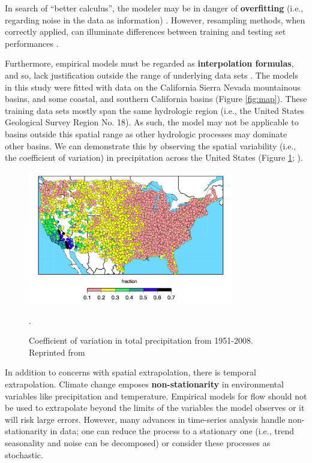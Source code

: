 In search of ``better calculus'', the modeler may be in danger of \textbf{overfitting} (i.e., regarding noise in the data as information) \cite{klemes1982empirical}. However, resampling methods, when correctly applied, can illuminate differences between training and testing set performances \cite{friedman2001elements}.

Furthermore, empirical models must be regarded as \textbf{interpolation formulas}, and so, lack justification outside the range of underlying data sets \cite{klemes1982empirical}. The models in this study were fitted with data on the California Sierra Nevada mountainous basins, and some coastal, and southern California basins (Figure \ref{fig:map}). These training data sets mostly span the same hydrologic region (i.e., the United States Geological Survey Region No. 18). As such, the model may not be applicable to basins outside this spatial range as other hydrologic processes may dominate other basins. We can demonstrate this by observing the spatial variability (i.e., the coefficient of variation) in precipitation across the United States (Figure \ref{fig:coefvar}; ). 

\begin{figure}[ht]
	\centering
	\includegraphics[width=0.8\textwidth,trim={0 0 0 0},clip=true]{Plots/ch1_coefficientofvariation.png}
	\caption{Coefficient of variation in total precipitation from 1951-2008. Reprinted from \protect{}}.
	\label{fig:coefvar}
\end{figure}

In addition to concerns with spatial extrapolation, there is temporal extrapolation. Climate change emposes \textbf{non-stationarity} in environmental variables like precipitation and temperature. Empirical models for flow should not be used to extrapolate beyond the limits of the variables the model observes or it will risk large errors. However, many advances in time-series analysis handle non-stationarity in data; one can reduce the process to a stationary one (i.e., trend seasonality and noise can be decomposed) or consider these processes as stochastic.

